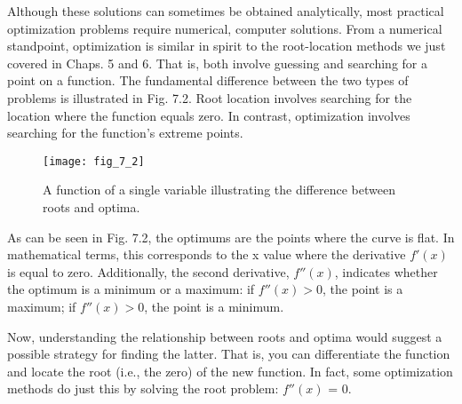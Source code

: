 \documentclass[../main.tex]{subfiles}
\begin{document}
Although these solutions can sometimes be obtained analytically, most practical
optimization problems require numerical, computer solutions. From a numerical standpoint,
optimization is similar in spirit to the root-location methods we just covered in
Chaps. 5 and 6. That is, both involve guessing and searching for a point on a function. The
fundamental difference between the two types of problems is illustrated in Fig. 7.2. Root
location involves searching for the location where the function equals zero. In contrast,
optimization involves searching for the function's extreme points.

\begin{figure}[H]
	\centering
	\texttt{[image: fig\_7\_2]}
	\caption{\textsf{A function of a single variable illustrating the difference between roots and optima.}}
	\label{fig:fig_7_2}
\end{figure}

As can be seen in Fig. 7.2, the optimums are the points where the curve is flat. In mathematical
terms, this corresponds to the x value where the derivative $f'(x)$ is equal to zero. Additionally, the second derivative,
$f''(x)$, indicates whether the optimum is a minimum or a maximum: if $f''(x) > 0$, 
the point is a maximum; if $f''(x) > 0$, the point is a minimum.

Now, understanding the relationship between roots and optima would suggest a possible
strategy for finding the latter. That is, you can differentiate the function and locate the
root (i.e., the zero) of the new function. In fact, some optimization methods do just this by
solving the root problem: $f''(x)$ = 0.
\newline
\end{document}
